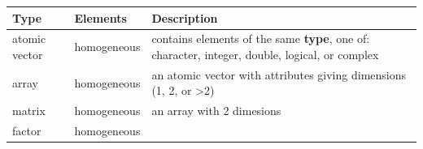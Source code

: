 \documentclass[]{book}
\begin{document}
\begin{longtable}[]{@{}lll@{}}
\toprule
\begin{minipage}[b]{0.10\columnwidth}\raggedright
Type\strut
\end{minipage} & \begin{minipage}[b]{0.10\columnwidth}\raggedright
Elements\strut
\end{minipage} & \begin{minipage}[b]{0.71\columnwidth}\raggedright
Description\strut
\end{minipage}\tabularnewline
\midrule
\endhead
\begin{minipage}[t]{0.10\columnwidth}\raggedright
atomic vector\strut
\end{minipage} & \begin{minipage}[t]{0.10\columnwidth}\raggedright
homogeneous\strut
\end{minipage} & \begin{minipage}[t]{0.71\columnwidth}\raggedright
contains elements of the same \textbf{type}, one of: character, integer, double, logical, or complex\strut
\end{minipage}\tabularnewline
\begin{minipage}[t]{0.10\columnwidth}\raggedright
array\strut
\end{minipage} & \begin{minipage}[t]{0.10\columnwidth}\raggedright
homogeneous\strut
\end{minipage} & \begin{minipage}[t]{0.71\columnwidth}\raggedright
an atomic vector with attributes giving dimensions (1, 2, or \textgreater2)\strut
\end{minipage}\tabularnewline
\begin{minipage}[t]{0.10\columnwidth}\raggedright
matrix\strut
\end{minipage} & \begin{minipage}[t]{0.10\columnwidth}\raggedright
homogeneous\strut
\end{minipage} & \begin{minipage}[t]{0.71\columnwidth}\raggedright
an array with 2 dimesions\strut
\end{minipage}\tabularnewline
\begin{minipage}[t]{0.10\columnwidth}\raggedright
factor\strut
\end{minipage} & \begin{minipage}[t]{0.10\columnwidth}\raggedright
homogeneous\strut
\end{minipage} & \begin{minipage}[t]{0.71\columnwidth}\raggedright

\end{minipage}
\end{longtable}
\end{document}
